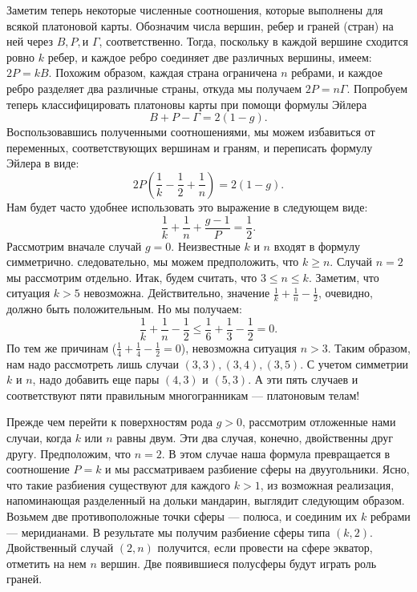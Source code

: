 \documentclass[12pt, a4paper, openany]{amsart}
\theoremstyle{plain}
\theoremstyle{definition}
\theoremstyle{remark}
\begin{document}
	
Заметим теперь некоторые численные соотношения, которые выполнены для
всякой платоновой карты. Обозначим числа вершин, ребер и граней
(стран) на ней через $B,P, и $ $\Gamma$, соответственно.  Тогда,
поскольку в каждой вершине сходится ровно $k$ ребер, и каждое ребро
соединяет две различных вершины, имеем: $2P=kB$. Похожим образом,
каждая страна ограничена $n$ ребрами, и каждое ребро разделяет два
различные страны, откуда мы получаем $2P=n\Gamma$. Попробуем теперь
классифицировать платоновы карты при помощи формулы Эйлера
	$$
	B+P-\Gamma=2(1-g).
	$$
	Воспользовавшись полученными соотношениями, мы можем избавиться от переменных, соответствующих вершинам и граням, и  переписать формулу Эйлера в виде: 
	\begin{equation*}
	2P(\frac{1}{k}-\frac{1}{2}+\frac{1}{n})=2(1-g).
    \end{equation*}
     Нам будет часто удобнее использовать это выражение в следующем виде:
    \begin{equation}\label{one}
    \frac{1}{k}+\frac{1}{n}+\frac{g-1}{P}=\frac{1}{2}.
    \end{equation}
	Рассмотрим вначале случай $g=0$.  Неизвестные $k$ и $n$ входят в формулу симметрично. следовательно, мы можем предположить, что $k\ge n$. Случай 
	$n=2$ мы рассмотрим отдельно. Итак, будем считать, что $3\le n\le k$.
	Заметим, что ситуация $k>5$ невозможна. Действительно, значение $\frac{1}{k}+\frac{1}{n}-\frac{1}{2}$, очевидно, должно быть положительным.  Но мы получаем:
	$$
	\frac{1}{k}+\frac{1}{n}-\frac{1}{2}\le \frac{1}{6}+\frac{1}{3}-\frac{1}{2}=0.
	$$
	По тем же причинам ($\frac{1}{4}+\frac{1}{4}-\frac{1}{2}=0$), невозможна ситуация $n>3$. 
	Таким образом, нам надо рассмотреть лишь случаи $(3,3), (3,4), (3,5)$. 
	С учетом симметрии $k$ и $n$, надо добавить еще пары $(4,3)$ и $(5,3)$.
	   А эти пять случаев и соответствуют пяти правильным многогранникам --- платоновым телам!
	   
	Прежде чем перейти к поверхностям рода $g>0$, рассмотрим отложенные нами случаи, когда $k$ или $n$ равны двум. Эти два случая, конечно, двойственны друг другу. Предположим, что $n=2$. В этом случае наша формула превращается в соотношение $P=k$ и мы рассматриваем разбиение сферы на двуугольники.
	Ясно, что такие разбиения существуют для каждого $k>1$, из возможная реализация, напоминающая разделенный на дольки мандарин, выглядит следующим образом. Возьмем две противоположные точки сферы --- полюса, и соединим их 
	$k$ ребрами --- меридианами. В результате мы получим разбиение сферы типа 
	$(k,2)$. Двойственный случай $(2,n)$ получится, если провести на сфере экватор, отметить на нем $n$ вершин. Две появившиеся полусферы будут играть роль граней.   
	   
\end{document}
